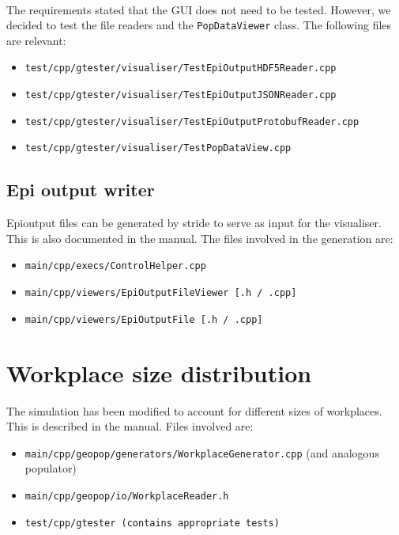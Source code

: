 \documentclass{article}
\begin{document}
\paragraph{} The requirements stated that the GUI does not need to be tested. However, we decided to test the file readers and the \texttt{PopDataViewer} class. The following files are relevant:
\begin{itemize}
\item \texttt{test/cpp/gtester/visualiser/TestEpiOutputHDF5Reader.cpp}
\item \texttt{test/cpp/gtester/visualiser/TestEpiOutputJSONReader.cpp}
\item \texttt{test/cpp/gtester/visualiser/TestEpiOutputProtobufReader.cpp}
\item \texttt{test/cpp/gtester/visualiser/TestPopDataView.cpp}
\end{itemize}

\subsection{Epi output writer}

Epioutput files can be generated by stride to serve as input for the visualiser. This is also documented in the manual. The files involved in the generation are:

\begin{itemize}
\item \texttt{main/cpp/execs/ControlHelper.cpp}
\item \texttt{main/cpp/viewers/EpiOutputFileViewer [.h / .cpp]}
\item \texttt{main/cpp/viewers/EpiOutputFile [.h / .cpp]}
\end{itemize}

\section{Workplace size distribution}
The simulation has been modified to account for different sizes of workplaces. This is described in the manual. Files involved are:

\begin{itemize}
\item \texttt{main/cpp/geopop/generators/WorkplaceGenerator.cpp} (and analogous populator)
\item \texttt{main/cpp/geopop/io/WorkplaceReader.h}
\item \texttt{test/cpp/gtester (contains appropriate tests)}
\end{itemize}
\end{document}
